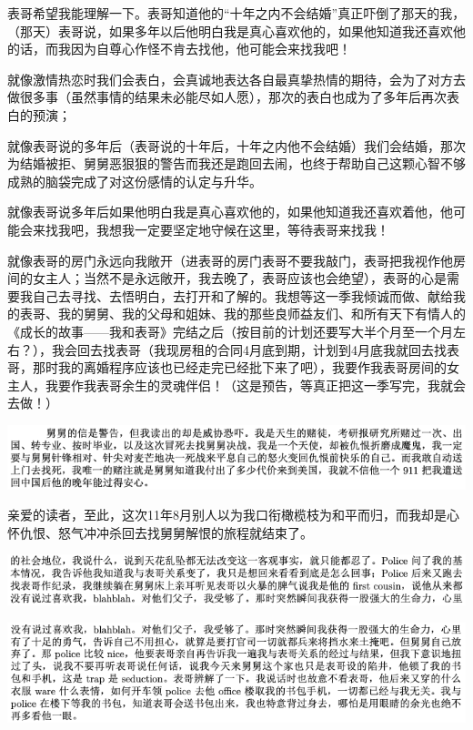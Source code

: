 \documentclass[9pt, b5paper]{article}
\begin{document}
表哥希望我能理解一下。表哥知道他的“十年之内不会结婚”真正吓倒了那天的我，（那天）表哥说，如果多年以后他明白我是真心喜欢他的，如果他知道我还喜欢他的话，而我因为自尊心作怪不肯去找他，他可能会来找我吧！

就像激情热恋时我们会表白，会真诚地表达各自最真挚热情的期待，会为了对方去做很多事（虽然事情的结果未必能尽如人愿），那次的表白也成为了多年后再次表白的预演；

就像表哥说的多年后（表哥说的十年后，十年之内他不会结婚）我们会结婚，那次为结婚被拒、舅舅恶狠狠的警告而我还是跑回去闹，也终于帮助自己这颗心智不够成熟的脑袋完成了对这份感情的认定与升华。

就像表哥说多年后如果他明白我是真心喜欢他的，如果他知道我还喜欢着他，他可能会来找我吧，我想我一定要坚定地守候在这里，等待表哥来找我！

就像表哥的房门永远向我敞开（进表哥的房门表哥不要我敲门，表哥把我视作他房间的女主人；当然不是永远敞开，我去晚了，表哥应该也会绝望），表哥的心是需要我自己去寻找、去悟明白，去打开和了解的。我想等这一季我倾诚而做、献给我的表哥、我的舅舅、我的父母和姐妹、我的那些良师益友们、和所有天下有情人的《成长的故事——我和表哥》完结之后（按目前的计划还要写大半个月至一个月左右？），我会回去找表哥（我现房租的合同4月底到期，计划到4月底我就回去找表哥，那时我的离婚程序应该也已经走完已经批下来了吧），我要作我表哥房间的女主人，我要作我表哥余生的灵魂伴侣！（这是预告，等真正把这一季写完，我就会去做！）

\begin{center}
\includegraphics[width=.9\linewidth]{./pic/p1p67-2.png}
\end{center}

亲爱的读者，至此，这次11年8月别人以为我口衔橄榄枝为和平而归，而我却是心怀仇恨、怒气冲冲杀回去找舅舅解恨的旅程就结束了。

\begin{center}
\includegraphics[width=.9\linewidth]{./pic/p1p68-4.png}
\end{center}

\begin{center}
\includegraphics[width=.9\linewidth]{./pic/p1p68-5.png}
\end{center}
\end{document}
